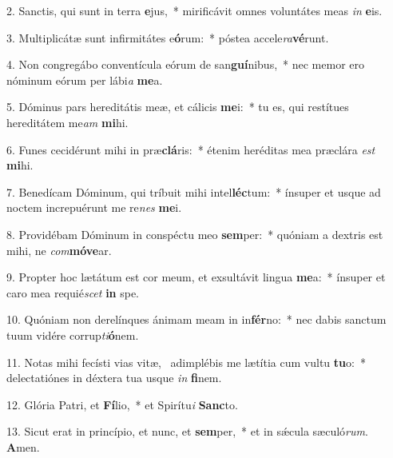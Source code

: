 2. Sanctis, qui sunt in terra \textbf{e}jus,~*  mirificávit omnes voluntátes meas \textit{in} \textbf{e}is.\

3. Multiplicátæ sunt infirmitátes e\textbf{ó}rum:~*  póstea accele\textit{ra}\textbf{vé}runt.\

4. Non congregábo conventícula eórum de san\textbf{guí}nibus,~*  nec memor ero nóminum eórum per lábi\textit{a} \textbf{me}a.\

5. Dóminus pars hereditátis meæ, et cálicis \textbf{me}i:~*  tu es, qui restítues hereditátem me\textit{am} \textbf{mi}hi.\

6. Funes cecidérunt mihi in præ\textbf{clá}ris:~*  étenim heréditas mea præclára \textit{est} \textbf{mi}hi.\

7. Benedícam Dóminum, qui tríbuit mihi intel\textbf{léc}tum:~*  ínsuper et usque ad noctem increpuérunt me re\textit{nes} \textbf{me}i.\

8. Providébam Dóminum in conspéctu meo \textbf{sem}per:~*  quóniam a dextris est mihi, ne \textit{com}\textbf{mó}\textbf{ve}ar.\

9. Propter hoc lætátum est cor meum, et exsultávit lingua \textbf{me}a:~*  ínsuper et caro mea requié\textit{scet} \textbf{in} spe.\

10. Quóniam non derelínques ánimam meam in in\textbf{fér}no:~*  nec dabis sanctum tuum vidére corrup\textit{ti}\textbf{ó}nem.\

11. Notas mihi fecísti vias vitæ, \dag\  adimplébis me lætítia cum vultu \textbf{tu}o:~*  delectatiónes in déxtera tua usque \textit{in} \textbf{fi}nem.\

12. Glória Patri, et \textbf{Fí}lio,~*  et Spirítu\textit{i} \textbf{Sanc}to.\

13. Sicut erat in princípio, et nunc, et \textbf{sem}per,~*  et in sǽcula sæculó\textit{rum}. \textbf{A}men.\

